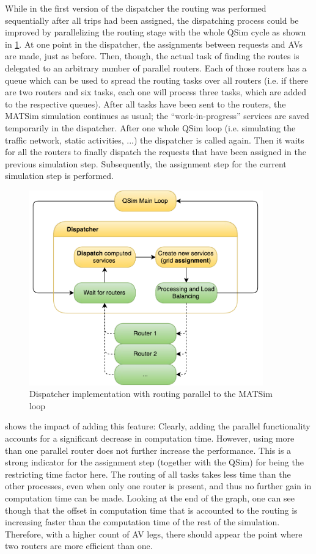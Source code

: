While in the first version of the dispatcher the routing was performed sequentially after
all trips had been assigned, the dispatching process could be improved by parallelizing
the routing stage with the whole QSim cycle as shown in \cref{fig:parallelrouting}.
At one point in the dispatcher, the assignments between requests
and AVs are made, just as before. Then, though, the actual task of finding the routes
is delegated to an arbitrary number of parallel routers. Each of those routers has
a queue which can be used to spread the routing tasks over all routers (i.e. if
there are two routers and six tasks, each one will process three tasks, which are
added to the respective queues). After all tasks have been sent to the routers,
the MATSim simulation continues as usual; the ``work-in-progress'' services are
saved temporarily in the dispatcher. After one whole QSim loop (i.e. simulating
the traffic network, static activities, ...) the dispatcher is called again. Then
it waits for all the routers to finally dispatch the requests that have
been assigned in the previous simulation step. Subsequently, the assignment step
for the current simulation step is performed.

\begin{figure}
    \centering
    \includegraphics[width=0.9\textwidth]{figures/parallelrouting.pdf}
    \caption{Dispatcher implementation with routing parallel to the MATSim loop}
    \label{fig:parallelrouting}
\end{figure}

 shows the impact of adding this feature: Clearly, adding the
parallel functionality accounts for a significant decrease in computation time.
However, using more than one parallel router does not further increase the performance.
This is a strong indicator for the assignment step (together with the QSim) for
being the restricting time factor here. The routing of all tasks takes less time
than the other processes, even when only one router is present, and thus no further
gain in computation time can be made. Looking at the end of the graph, one can see
though that the offset in computation time that is accounted to the routing
is increasing faster than the computation time of the rest of the simulation. Therefore,
with a higher count of AV legs, there should appear the point where two routers
are more efficient than one.


